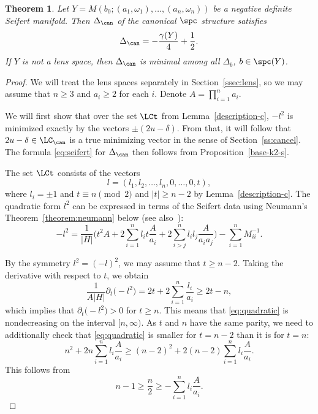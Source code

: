 \documentclass[10pt,a4paper]{amsart}
\newcounter{theorem}
\newtheorem{Theorem}{Theorem}[section]
\begin{document}
\begin{Theorem}\label{thm:seifert}
Let $Y = M(b_0;(a_1, \omega_1), \dots, (a_n, \omega_n))$ be a negative definite Seifert manifold. Then $\Delta_{\can}$ of the canonical $\spc$ structure satisfies
\begin{equation}\label{eq:seifert}
 \Delta_{\can} = -\frac{\gamma(Y)}{4} + \frac{1}{2}.
\end{equation}
If $Y$ is not a lens space, then $\Delta_{\can}$ is minimal among all $\Delta_b$, $b \in \spc(Y)$.
\end{Theorem}



\begin{proof}
We will treat the lens spaces separately in Section~\ref{ssec:lens}, so we may assume that $n \geq 3$ and $a_i \geq 2$ for each $i$. Denote $A = \prod_{i=1}^n a_i$.

We will first show that over the set $\LCt$ from Lemma~\ref{description-c}, $-l^2$ is minimized exactly by the vectors $\pm(2u-\delta)$. From that, it will follow that $2u-\delta \in \LC_{\can}$ is a true minimizing vector in the sense of Section~\ref{ss:cancel}. The formula \eqref{eq:seifert} for $\Delta_{\can}$ then follows from Proposition~\ref{base-k2-s}.

The set $\LCt$ consists of the vectors
\[
 l = (l_1, l_2, \dots, l_n, 0, \dots, 0, t),
\]
where $l_i = \pm 1$ and $t \equiv n \pmod{2}$ and $\lvert t \rvert \geq n-2$ by Lemma~\ref{description-c}. The quadratic form $l^2$ can be expressed in terms of the Seifert data using Neumann's Theorem~\ref{theorem:neumann}
below (see also~\cite[p.~19]{GKS23}):
\begin{equation}\label{eq:quadratic}
 -l^2 = \frac{1}{|H|} \Biggl(t^2 A + 2 \sum_{i=1}^n l_i t\frac{A}{a_i} +
 2 \sum_{i > j}^n l_i l_j \frac{A}{a_ia_j} \Biggr) - \sum_{i=1}^n M^{-1}_{ii}.
\end{equation}

By the symmetry $l^2 = (-l)^2$, we may assume that $t \geq n-2$. Taking the derivative with respect to $t$, we obtain
\[
\frac{1}{A |H|} \partial_t \bigl(-l^2\bigr) = 2t + 2\sum_{i=1}^n \frac{l_i}{a_i} \geq 2t - n,
\]
which implies that $\partial_t\bigl(-l^2\bigr) >0$ for $t \geq n$. This means that \eqref{eq:quadratic} is nondecreasing on the interval $[n,\infty)$. As $t$ and $n$ have the same parity, we need to additionally check that \eqref{eq:quadratic} is smaller for $t = n-2$ than it is for $t = n$:
\[
n^2+2n \sum_{i=1}^n l_i \frac{A}{a_i} \geq (n-2)^2+2(n-2)\sum_{i=1}^n l_i \frac{A}{a_i}.
\]
This follows from
\[n-1\geq \frac{n}{2} \geq -\sum_{i=1}^n l_i \frac{A}{a_i}.
\]




\end{proof}
\end{document}
